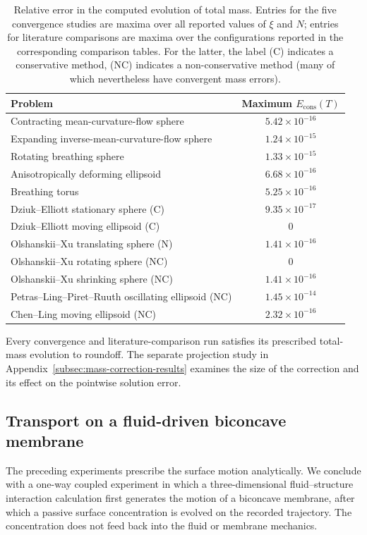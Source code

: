\documentclass[a4paper,fleqn]{cas-sc}
\begin{document}
\begin{table}[t]
\centering
\caption{Relative error in the computed evolution of total mass.  Entries for
the five convergence studies are maxima over all reported values of \(\xi\)
and \(N\); entries for literature comparisons are maxima over the
configurations reported in the corresponding comparison tables. For the latter, the label (C) indicates a conservative method, (NC) indicates a non-conservative method (many of which nevertheless have convergent mass errors).}
\label{tab:mass-conservation}
\begin{tabular}{l c}
\toprule
Problem & Maximum \(E_{\mathrm{cons}}(T)\) \\
\midrule
Contracting mean-curvature-flow sphere & \(5.42{\times}10^{-16}\) \\
Expanding inverse-mean-curvature-flow sphere & \(1.24{\times}10^{-15}\) \\
Rotating breathing sphere & \(1.33{\times}10^{-15}\) \\
Anisotropically deforming ellipsoid & \(6.68{\times}10^{-16}\) \\
Breathing torus & \(5.25{\times}10^{-16}\) \\
\midrule
Dziuk--Elliott stationary sphere (C) & \(9.35{\times}10^{-17}\) \\
Dziuk--Elliott moving ellipsoid (C) & \(0\) \\
Olshanskii--Xu translating sphere (N) & \(1.41{\times}10^{-16}\) \\
Olshanskii--Xu rotating sphere (NC) & \(0\) \\
Olshanskii--Xu shrinking sphere (NC) & \(1.41{\times}10^{-16}\) \\
Petras--Ling--Piret--Ruuth oscillating ellipsoid (NC) & \(1.45{\times}10^{-14}\) \\
Chen--Ling moving ellipsoid (NC) & \(2.32{\times}10^{-16}\) \\
\bottomrule
\end{tabular}
\end{table}

Every convergence and literature-comparison run satisfies its prescribed
total-mass evolution to roundoff.  The separate projection study in
Appendix~\ref{subsec:mass-correction-results} examines the size of the
correction and its effect on the pointwise solution error.

\subsection{Transport on a fluid-driven biconcave membrane}
\label{subsec:rbc-capstone}
The preceding experiments prescribe the surface motion analytically.  We
conclude with a one-way coupled experiment in which a three-dimensional
fluid--structure interaction calculation first generates the motion of a
biconcave membrane, after which a passive surface concentration is evolved on
the recorded trajectory.  The concentration does not feed back into the fluid
or membrane mechanics.
\end{document}
